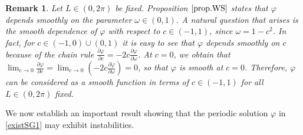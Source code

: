 \documentclass[12pt,reqno,a4paper]{amsart} %
\numberwithin{equation}{section}
\numberwithin{figure}{section}
\newtheorem{remark}[theorem]{Remark}
\begin{document}
 \begin{remark}\label{smoothcomega}
Let $L\in (0,2\pi)$ be fixed. Proposition $\ref{prop.WS}$ states that $\varphi$ depends smoothly on the parameter $\omega\in(0,1)$. A natural question that arises is the smooth dependence of $\varphi$ with respect to $c\in(-1,1)$, since $\omega=1-c^2$. In fact, for $c\in (-1,0)\cup(0,1)$ it is easy to see that $\varphi$ depends smoothly on $c$ because of the chain rule $\displaystyle\frac{\partial\varphi}{\partial c}=-2c\frac{\partial \varphi}{\partial\omega}$. At $c=0$, we obtain that $\displaystyle\lim_{c\rightarrow 0}\frac{\partial\varphi}{\partial c}=\lim_{c\rightarrow 0}\left(-2c\frac{\partial \varphi}{\partial\omega}\right)=0$, so that $\varphi$ is smooth at $c=0$. Therefore, $\varphi$ can be considered as a smooth function in terms of $c\in(-1,1)$ for all $L\in (0,2\pi)$ fixed.
 
 \end{remark}
 
 \indent We now establish an important result showing that the periodic solution $\varphi$ in \eqref{existSG1} may exhibit instabilities.
 
\end{document}

